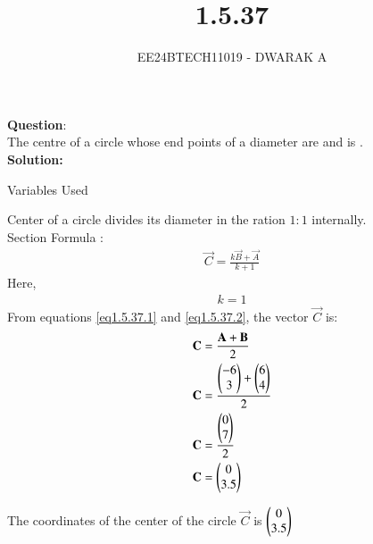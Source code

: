 \documentclass[journal]{IEEEtran}
\begin{document}

\vspace{3cm}

\title{1.5.37}
\author{EE24BTECH11019 - DWARAK A}
{\let\newpage\relax\maketitle}

\renewcommand{\thefigure}{\theenumi}
\renewcommand{\thetable}{\theenumi}
\setlength{\intextsep}{10pt} %


\renewcommand{\thetable}{\theenumi}


\textbf{Question}:
\\
The centre of a circle whose end points of a diameter are  and  is \underline{\hspace{1cm}} .
\\
\textbf{Solution: }
\begin{table}[h!]    
  \centering
  
  \caption{Variables Used}
  \label{tab1.5.37.1}
\end{table}

Center of a circle divides its diameter in the ration $1:1$ internally.\\

Section Formula :
\begin{align}
    \vec{C}=\frac{k\vec{B}+\vec{A}}{k+1}\label{eq1.5.37.1}
\end{align}
Here,
\begin{align}
    k=1\label{eq1.5.37.2}
\end{align}
From  equations \ref{eq1.5.37.1} and \ref{eq1.5.37.2}, the vector $\vec{C}$ is:
\begin{align}
    \mathbf{C}&=\frac{\mathbf{A}+\mathbf{B}}{2}\\
    \mathbf{C}&=\frac{\begin{pmatrix}-6\\3\end{pmatrix}+\begin{pmatrix}6\\4\end{pmatrix}}{2}\\
    \mathbf{C}&=\frac{\begin{pmatrix}0\\7\end{pmatrix}}{2}\\
    \mathbf{C}&=\begin{pmatrix}0\\3.5\end{pmatrix}
\end{align}

The coordinates of the center of the circle $\vec{C}$ is $\begin{pmatrix}0\\3.5\end{pmatrix}$
\end{document}
